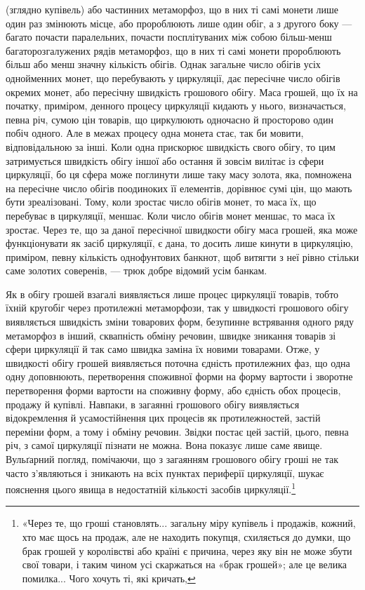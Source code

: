 (зглядно купівель) або частинних метаморфоз, що в них ті самі
монети лише один раз змінюють місце, або пророблюють лише
один обіг, а з другого боку — багато почасти паралельних,
почасти посплітуваних між собою більш-менш багаторозгалужених
рядів метаморфоз, що в них ті самі монети пророблюють
більш або менш значну кількість обігів. Однак загальне число
обігів усіх однойменних монет, що перебувають у циркуляції,
дає пересічне число обігів окремих монет, або пересічну швидкість
грошового обігу. Маса грошей, що їх на початку, приміром,
денного процесу циркуляції кидають у нього, визначається,
певна річ, сумою цін товарів, що циркулюють одночасно й просторово
один побіч одного. Але в межах процесу одна монета
стає, так би мовити, відповідальною за інші. Коли одна прискорює
швидкість свого обігу, то цим затримується швидкість обігу
іншої або остання й зовсім вилітає із сфери циркуляції, бо ця
сфера може поглинути лише таку масу золота, яка, помножена
на пересічне число обігів поодиноких її елементів, дорівнює сумі
цін, що мають бути зреалізовані. Тому, коли зростає число обігів
монет, то маса їх, що перебуває в циркуляції, меншає. Коли
число обігів монет меншає, то маса їх зростає. Через те, що за
даної пересічної швидкости обігу маса грошей, яка може функціонувати
як засіб циркуляції, є дана, то досить лише кинути
в циркуляцію, приміром, певну кількість однофунтових банкнот,
щоб витягти з неї рівно стільки саме золотих соверенів, — трюк
добре відомий усім банкам.

Як в обігу грошей взагалі виявляється лише процес циркуляції
товарів, тобто їхній кругобіг через протилежні метаморфози,
так у швидкості грошового обігу виявляється швидкість зміни
товарових форм, безупинне встрявання одного ряду метаморфоз
в інший, сквапність обміну речовин, швидке зникання товарів
зі сфери циркуляції й так само швидка заміна їх новими товарами.
Отже, у швидкості обігу грошей виявляється поточна єдність
протилежних фаз, що одна одну доповнюють, перетворення
споживної форми на форму вартости і зворотне перетворення
форми вартости на споживну форму, або єдність обох процесів,
продажу й купівлі. Навпаки, в загаянні грошового обігу виявляється
відокремлення й усамостійнення цих процесів як протилежностей,
застій переміни форм, а тому і обміну речовин. Звідки
постає цей застій, цього, певна річ, з самої циркуляції пізнати
не можна. Вона показує лише саме явище. Вульґарний погляд,
помічаючи, що з загаянням грошового обігу гроші не так часто
з’являються і зникають на всіх пунктах периферії циркуляції,
шукає пояснення цього явища в недостатній кількості засобів
циркуляції.\footnote{
«Через те, що гроші становлять... загальну міру купівель і продажів,
кожний, хто має щось на продаж, але не находить покупця, схиляється
до думки, що брак грошей у королівстві або країні є причина,
через яку він не може збути свої товари, і таким чином усі скаржаться на
«брак грошей»; але це велика помилка... Чого хочуть ті, які кричать,
}